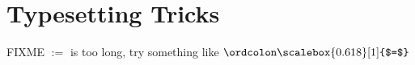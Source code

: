 \documentclass[11pt]{article} %
\theoremstyle{definition}
\theoremstyle{remark}
\begin{document}

\part{Typesetting Tricks}

FIXME $:=$ is too long, try something like $\mathrel{\ordcolon\scalebox{0.618}[1]{$=$}}$
\end{document}
